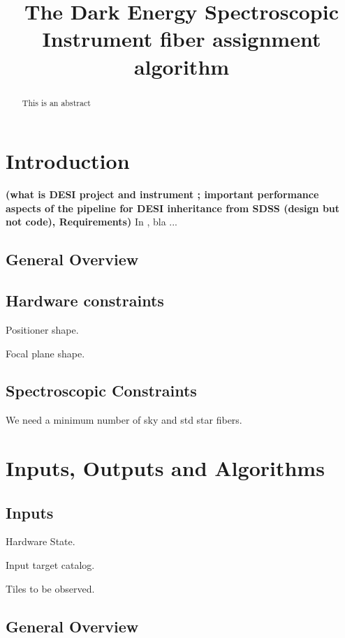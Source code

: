 \documentclass[onecolumn]{aastex63}
\newcommand{\TODO}[1]{{\bf (#1)}}
\begin{document}
\title{
The Dark Energy Spectroscopic Instrument fiber assignment algorithm
}



\begin{abstract}
This is an abstract
\end{abstract}



\tableofcontents


\section{Introduction}
\label{sec:Introduction}
\TODO{what is DESI project and instrument ; important performance aspects of the pipeline for DESI
  inheritance from SDSS (design but not code), Requirements}
In \cite{Bolton2012}, bla ... 

\subsection{General Overview}

\subsection{Hardware constraints}

Positioner shape.

Focal plane shape.


\subsection{Spectroscopic Constraints}

We need a minimum number of sky and std star fibers.

\section{Inputs, Outputs and Algorithms}

\subsection{Inputs}

Hardware State.

Input target catalog.

Tiles to be observed.

\subsection{General Overview}
\end{document}
